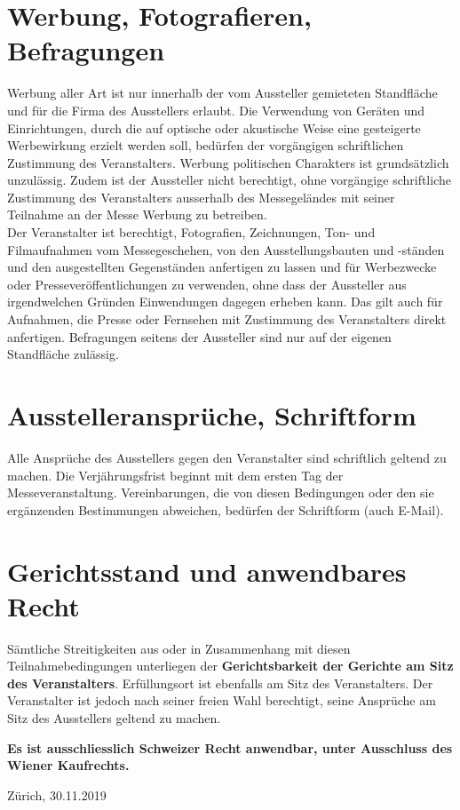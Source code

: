 \documentclass[8pt,a4paper]{article}
\begin{document}
\begin{multicols}{2}
\section{Werbung, Fotografieren, Befragungen}
Werbung aller Art ist nur innerhalb der vom Aussteller gemieteten Standfläche und für die Firma des Ausstellers erlaubt. Die Verwendung von Geräten und Einrichtungen, durch die auf optische oder akustische Weise eine gesteigerte Werbewirkung erzielt werden soll, bedürfen der vorgängigen schriftlichen Zustimmung des Veranstalters. Werbung politischen Charakters ist grundsätzlich unzulässig. Zudem ist der Aussteller nicht berechtigt, ohne vorgängige schriftliche Zustimmung des Veranstalters ausserhalb des Messegeländes mit seiner Teilnahme an der Messe Werbung zu betreiben.\\
Der Veranstalter ist berechtigt, Fotografien, Zeichnungen, Ton- und Filmaufnahmen vom Messegeschehen, von den Ausstellungsbauten und -ständen und den ausgestellten Gegenständen anfertigen zu lassen und für Werbezwecke oder Presseveröffentlichungen zu verwenden, ohne dass der Aussteller aus irgendwelchen Gründen Einwendungen dagegen erheben kann. Das gilt auch für Aufnahmen, die Presse oder Fernsehen mit Zustimmung des Veranstalters direkt anfertigen. Befragungen seitens der Aussteller sind nur auf der eigenen Standfläche zulässig.

\section{Ausstelleransprüche, Schriftform}
Alle Ansprüche des Ausstellers gegen den Veranstalter sind schriftlich geltend zu machen. Die Verjährungsfrist beginnt mit dem ersten Tag der Messeveranstaltung. Vereinbarungen, die von diesen Bedingungen oder den sie ergänzenden Bestimmungen abweichen, bedürfen der Schriftform (auch E-Mail). 

\section{Gerichtsstand und anwendbares Recht}
Sämtliche Streitigkeiten aus oder in Zusammenhang mit diesen Teilnahmebedingungen unterliegen der \textbf{Gerichtsbarkeit der Gerichte am Sitz des Veranstalters}. Erfüllungsort ist ebenfalls am Sitz des Veranstalters. Der Veranstalter ist jedoch nach seiner freien Wahl berechtigt, seine Ansprüche am Sitz des Ausstellers geltend zu machen. 

\vspace{.75cm}
\textbf{Es ist ausschliesslich Schweizer Recht anwendbar, unter Ausschluss des Wiener Kaufrechts.}

\vspace{.75cm}
Zürich, 30.11.2019

\end{multicols}
\end{document}
